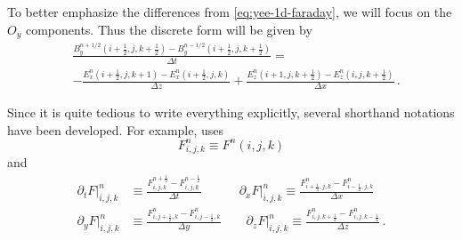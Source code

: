 \documentclass[12pt, class=report, crop=false]{standalone}
\begin{document}
To better emphasize the differences from \cref{eq:yee-1d-faraday}, we will focus on the
\(O_y\) components. Thus the discrete form will be given by
\begin{equation}
  \label{eq:yee-3d-faraday-y}
  \begin{aligned}
    &\frac{B_y^{n+1/2}(i+\frac{1}{2},j,k+\frac{1}{2})
    - B_y^{n-1/2}(i+\frac{1}{2},j,k+\frac{1}{2})}{\Delta t} = \\
    &- \frac{E_x^{n}(i+\frac{1}{2},j,k+1) - E_x^{n}(i+\frac{1}{2},j,k)}{\Delta z}
    + \frac{E_z^{n}(i+1,j,k+\frac{1}{2}) - E_z^{n}(i,j,k+\frac{1}{2})}{\Delta x}\,.
  \end{aligned}
\end{equation}

Since it is quite tedious to write everything explicitly, several shorthand
notations have been developed. For example, \textcite{lehe_electromagneticparticleincell_2018}
uses
\[
F^n_{i,j,k} \equiv F^n(i,j,k)
\]
and
\begin{align*}
  \partial_t F \rvert^n_{i,j,k} &\equiv \frac{F^{n+\frac{1}{2}}_{i,j,k} - F^{n-\frac{1}{2}}_{i,j,k}}{\Delta t} \qquad\quad
  \partial_x F \rvert^n_{i,j,k} \equiv \frac{F^n_{i+\frac{1}{2},j,k} - F^n_{i-\frac{1}{2},j,k}}{\Delta x} \\
  \partial_y F \rvert^n_{i,j,k} &\equiv \frac{F^n_{i,j+\frac{1}{2},k} - F^n_{i,j-\frac{1}{2},k}}{\Delta y} \qquad
  \partial_z F \rvert^n_{i,j,k} \equiv \frac{F^n_{i,j,k+\frac{1}{2}} - F^n_{i,j,k-\frac{1}{2}}}{\Delta z} \,.
\end{align*}
\end{document}
